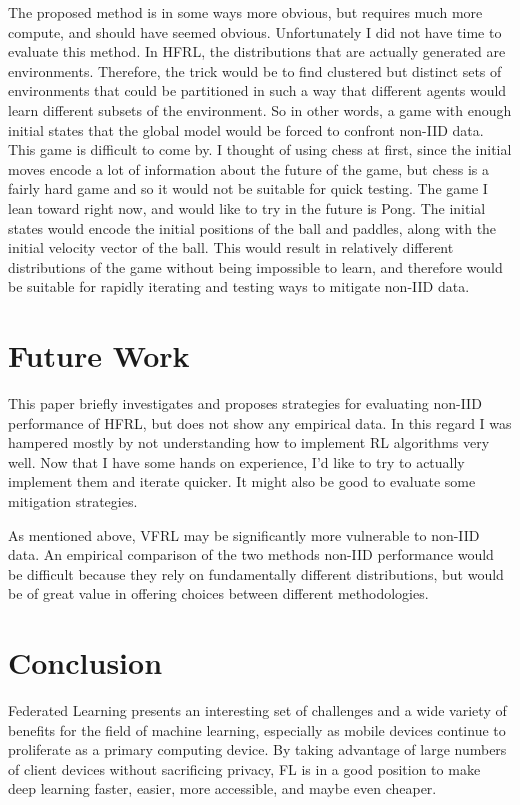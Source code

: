\documentclass[10pt,journal]{IEEEtran}
\begin{document}
The proposed method is in some ways more obvious, but requires much more compute, and should have seemed obvious.
Unfortunately I did not have time to evaluate this method. In HFRL, the distributions that are actually generated
are environments. Therefore, the trick would be to find clustered but distinct sets of environments that could
be partitioned in such a way that different agents would learn different subsets of the environment. So in other
words, a game with enough initial states that the global model would be forced to confront non-IID data. This
game is difficult to come by. I thought of using chess at first, since the initial moves encode a lot of information
about the future of the game, but chess is a fairly hard game and so it would not be suitable for quick testing.
The game I lean toward right now, and would like to try in the future is Pong. The initial states would encode the
initial positions of the ball and paddles, along with the initial velocity vector of the ball. This would result in
relatively different distributions of the game without being impossible to learn, and therefore would be suitable
for rapidly iterating and testing ways to mitigate non-IID data.

\section{Future Work}
This paper briefly investigates and proposes strategies for evaluating non-IID performance of HFRL, but does not
show any empirical data. In this regard I was hampered mostly by not understanding how to implement RL algorithms
very well. Now that I have some hands on experience, I'd like to try to actually implement them and iterate quicker.
It might also be good to evaluate some mitigation strategies.

As mentioned
above, VFRL may be significantly more vulnerable to non-IID data. An empirical comparison of the two methods
non-IID performance would be difficult because they rely on fundamentally different distributions, but would be
of great value in offering choices between different methodologies.

\section{Conclusion}
Federated Learning presents an interesting set of challenges and a wide variety of benefits for the field
of machine learning, especially as mobile devices continue to proliferate as a primary computing device.
By taking advantage of large numbers of client devices without sacrificing privacy, FL is in a good position
to make deep learning faster, easier, more accessible, and maybe even cheaper.

\ifCLASSOPTIONcaptionsoff
  \newpage
\fi


\end{document}
